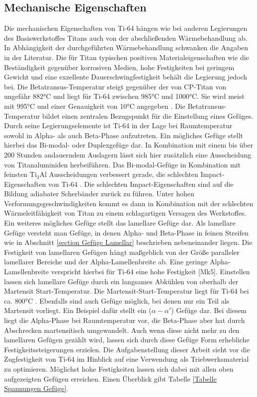 \documentclass[a4paper, 11pt]{tubsreprt}
\begin{document}
\subsection{Mechanische Eigenschaften}
Die mechanischen Eigenschaften von Ti-64 hängen wie bei anderen Legierungen des Basiswerkstoffes Titans auch von der abschließenden Wärmebehandlung ab. In Abhängigkeit der durchgeführten Wärmebehandlung schwanken die Angaben in der Literatur. Die für Titan typischen positiven Materialeigenschaften wie die Beständigkeit gegenüber korrosiven Medien, hohe Festigkeiten bei geringem Gewicht und eine exzellente Dauerschwingfestigkeit behält die Legierung jedoch bei. Die Betatransus-Temperatur steigt gegenüber der von CP-Titan von ungefähr 882°C \cite[s. 23]{Luetjering2007} und liegt für Ti-64 zwischen 985°C und 1000°C. Sie wird meist mit 995°C und einer Genauigkeit von 10°C angegeben \cite{Semiatin2003}\cite{Chen2008}. Die Betatransus-Temperatur bildet einen zentralen Bezugspunkt für die Einstellung eines Gefüges. Durch seine Legierungselemente ist Ti-64 in der Lage bei Raumtemperatur sowohl in Alpha- als auch Beta-Phase aufzutreten.
Ein mögliches Gefüge stellt hierbei das Bi-modal- oder Duplexgefüge dar. In Kombination mit einem bis über 200 Stunden andauerndem Auslagern lässt sich hier zusätzlich eine Ausscheidung von Titanaluminiden  herbeiführen. Das Bi-modal-Gefüge in Kombination mit feinsten Ti$_{3}$Al Ausscheidungen verbessert gerade, die schlechten Impact-Eigenschaften von Ti-64 \cite{Lee2005}. Die schlechten Impact-Eigenschaften sind auf die Bildung adiabater Scherbänder zurück zu führen. Unter hohen Verformungsgeschwindigkeiten kommt es dann in Kombination mit der schlechten Wärmeleitfähigkeit von Titan zu einem schlagartigen Versagen des Werkstoffes.
Ein weiteres mögliches Gefüge stellt das lamellare Gefüge dar. Als lamellare Gefüge versteht man Gefüge, in denen Alpha- und Beta-Phase in feinen Streifen wie in Abschnitt \ref{section Gefüge Lamellar} beschrieben nebeneinander liegen. Die Festigkeit von lamellaren Gefügen hängt maßgeblich von der Größe paralleler lamellarer Bereiche und der Alpha-Lamellenbreite ab. Eine geringe Alpha-Lamellenbreite verspricht hierbei für Ti-64 eine hohe Festigkeit [Mk5]. Einstellen lassen sich lamellare Gefüge durch ein langsames Abkühlen von oberhalb der Martensit Start-Temperatur. Die Martensit-Start-Temperatur liegt für Ti-64 bei ca. 800°C \cite{Boyer1994}. Ebenfalls sind auch Gefüge möglich, bei denen nur ein Teil als Martensit vorliegt. Ein Beispiel dafür stellt ein ($\alpha-\alpha'$) Gefüge dar. Bei diesem liegt die Alpha-Phase bei Raumtemperatur vor, die Beta-Phase aber hat durch Abschrecken martensitisch umgewandelt. Auch wenn diese nicht mehr zu den lamellaren Gefügen gezählt wird, lassen sich durch diese Gefüge Form erhebliche Festigkeitssteigerungen erzielen. Die Aufgabenstellung dieser Arbeit sieht vor die Zugfestigkeit von Ti-64 im Hinblick auf eine Verwendung als Triebwerksmaterial zu optimieren. Möglichst hohe Festigkeiten lassen sich dabei mit allen oben aufgezeigten Gefügen erreichen. Einen Überblick gibt Tabelle \ref{Tabelle Spannungen Gefüge}.
\end{document}
